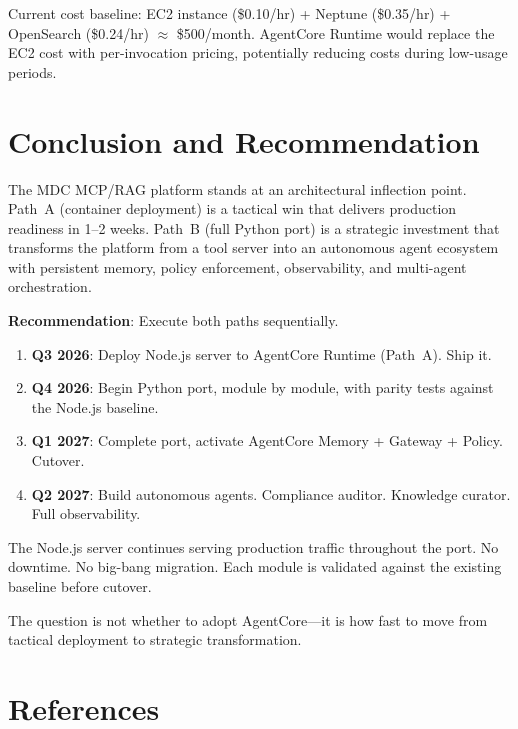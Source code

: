 \documentclass[11pt,letterpaper]{article}
\begin{document}
Current cost baseline: EC2 instance (\$0.10/hr) + Neptune (\$0.35/hr) +
OpenSearch (\$0.24/hr) $\approx$ \$500/month. AgentCore Runtime would
replace the EC2 cost with per-invocation pricing, potentially reducing
costs during low-usage periods.

\section{Conclusion and Recommendation}

The MDC MCP/RAG platform stands at an architectural inflection point.
Path~A (container deployment) is a tactical win that delivers production
readiness in 1--2 weeks. Path~B (full Python port) is a strategic
investment that transforms the platform from a tool server into an
autonomous agent ecosystem with persistent memory, policy enforcement,
observability, and multi-agent orchestration.

\textbf{Recommendation}: Execute both paths sequentially.

\begin{enumerate}[noitemsep]
    \item \textbf{Q3 2026}: Deploy Node.js server to AgentCore Runtime
          (Path~A). Ship it.
    \item \textbf{Q4 2026}: Begin Python port, module by module, with
          parity tests against the Node.js baseline.
    \item \textbf{Q1 2027}: Complete port, activate AgentCore Memory +
          Gateway + Policy. Cutover.
    \item \textbf{Q2 2027}: Build autonomous agents. Compliance auditor.
          Knowledge curator. Full observability.
\end{enumerate}

The Node.js server continues serving production traffic throughout the
port. No downtime. No big-bang migration. Each module is validated
against the existing baseline before cutover.

The question is not whether to adopt AgentCore---it is how fast to move
from tactical deployment to strategic transformation.

\section*{References}
\end{document}
